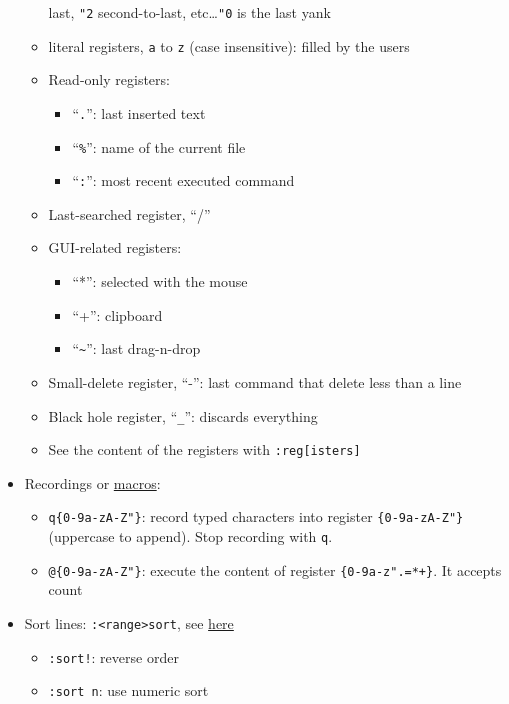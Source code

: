 \documentclass[a4paper,12pt,%
              final%
              ]{article}
\begin{document}
\begin{itemize}
\begin{itemize}
        last, \texttt{"2} second-to-last, etc\ldots \texttt{"0} is the last yank
      \item literal registers, \texttt{a} to \texttt{z} (case insensitive): filled by
        the users
      \item Read-only registers:
        \begin{itemize}
          \item ``\texttt{.}'': last inserted text
          \item ``\verb!%!'': name of the current file
          \item ``\texttt{:}'': most recent executed command
        \end{itemize}
      \item Last-searched register, ``/''
      \item GUI-related registers:
        \begin{itemize}
          \item ``*'': selected with the mouse
          \item ``+'': clipboard
          \item ``\verb|~|'': last drag-n-drop
        \end{itemize}
      \item Small-delete register, ``-'': last command that delete less than a line
      \item Black hole register, ``\verb|_|'': discards everything
      \item See the content of the registers with \verb|:reg[isters]|
    \end{itemize}
  \item Recordings or
    \href{https://vim.fandom.com/wiki/Macros#Viewing_a_macro}{macros}:
    \begin{itemize}
      \item \verb|q{0-9a-zA-Z"}|: record typed characters into register
        \verb|{0-9a-zA-Z"}| (uppercase to append). Stop recording with \verb|q|.
      \item \verb|@{0-9a-zA-Z"}|: execute the content of register
        \verb|{0-9a-z".=*+}|. It accepts count
    \end{itemize}
  \item Sort lines: \verb|:<range>sort|, see \href{https://vim.fandom.com/wiki/Sort_lines}{here}
    \begin{itemize}
      \item \verb|:sort!|: reverse order
      \item \verb|:sort n|: use numeric sort

\end{itemize}
\end{itemize}
\end{document}
